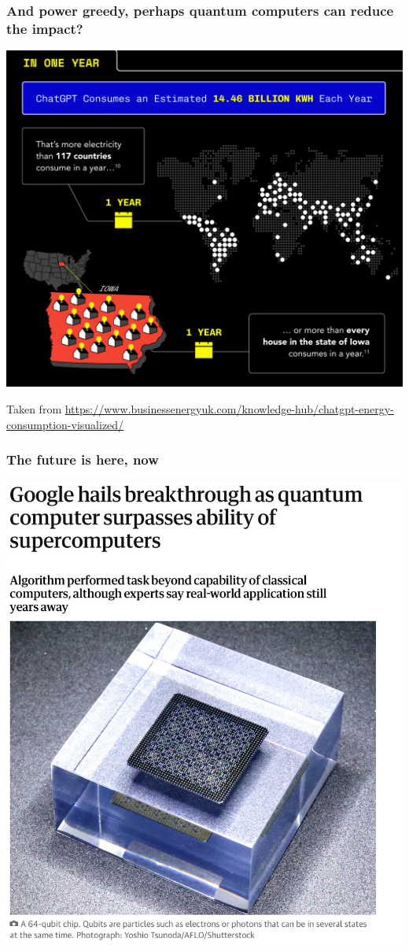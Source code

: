 \documentclass{beamer}
\begin{document}
\begin{frame}
\frametitle{And power greedy, perhaps quantum computers can reduce the impact?}

\centerline{\includegraphics[width=0.7\linewidth]{figures/aitalk1.png}}
Taken from \url{https://www.businessenergyuk.com/knowledge-hub/chatgpt-energy-consumption-visualized/}
\end{frame}




\begin{frame}
\frametitle{The future is here, now}


\centerline{\includegraphics[width=1.05\linewidth]{figures/figuregoogle.png}}

\end{frame}
\end{document}
